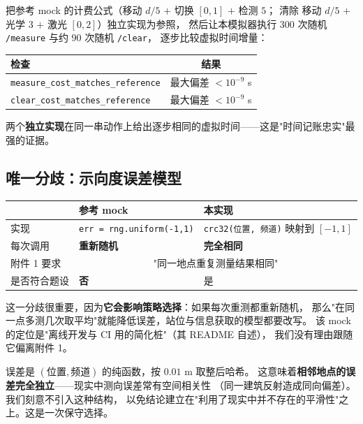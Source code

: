 把参考 mock 的计费公式（移动 $d/5$ $+$ 切换 $[0,1]$ $+$ 检测 $5$；
清除 移动 $d/5$ $+$ 光学 $3$ $+$ 激光 $[0,2]$）独立实现为参照，
然后让本模拟器执行 300 次随机 \texttt{/measure} 与约 90 次随机 \texttt{/clear}，
逐步比较虚拟时间增量：

\begin{center}
\begin{tabular}{lc}
\toprule
检查 & 结果 \\ \midrule
\texttt{measure\_cost\_matches\_reference} & 最大偏差 $<10^{-9}$ s \\
\texttt{clear\_cost\_matches\_reference} & 最大偏差 $<10^{-9}$ s \\
\bottomrule
\end{tabular}
\end{center}

两个\textbf{独立实现}在同一串动作上给出逐步相同的虚拟时间——这是"时间记账忠实"最强的证据。

\subsection{唯一分歧：示向度误差模型}

\begin{center}
\begin{tabular}{p{4.0cm}p{5.4cm}p{5.4cm}}
\toprule
 & 参考 mock & 本实现 \\ \midrule
实现 & \texttt{err = rng.uniform(-1,1)} & \texttt{crc32(位置, 频道)} 映射到 $[-1,1]$ \\
每次调用 & \textbf{重新随机} & \textbf{完全相同} \\
附件 1 要求 & \multicolumn{2}{c}{"同一地点重复测量结果相同"} \\
是否符合题设 & \textbf{否} & 是 \\
\bottomrule
\end{tabular}
\end{center}

这一分歧很重要，因为\textbf{它会影响策略选择}：如果每次重测都重新随机，
那么"在同一点多测几次取平均"就能降低误差，站位与信息获取的模型都要改写。
该 mock 的定位是"离线开发与 CI 用的简化桩"（其 README 自述），
我们没有理由跟随它偏离附件 1。

\begin{keybox}[title=本实现的误差模型为何刻意"无空间结构"]
误差是 $(\text{位置},\text{频道})$ 的纯函数，按 $0.01$ m 取整后哈希。
这意味着\textbf{相邻地点的误差完全独立}——现实中测向误差常有空间相关性
（同一建筑反射造成同向偏差）。我们刻意不引入这种结构，
以免结论建立在"利用了现实中并不存在的平滑性"之上。这是一次保守选择。
\end{keybox}

